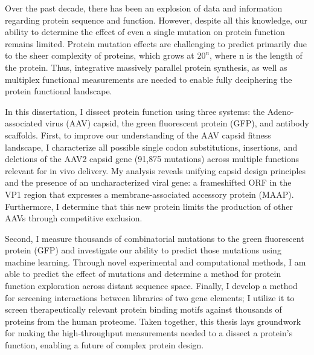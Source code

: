 
Over the past decade, there has been an explosion of data and information regarding protein sequence and function. However, despite all this knowledge, our ability to determine the effect of even a single mutation on protein function remains limited. Protein mutation effects are challenging to predict primarily due to the sheer complexity of proteins, which grows at \(20^n \), where n is the length of the protein. Thus, integrative massively parallel protein synthesis, as well as multiplex functional measurements are needed to enable fully deciphering the protein functional landscape. 

In this dissertation, I dissect protein function using three systems: the Adeno-associated virus (AAV) capsid, the green fluorescent protein (GFP), and antibody scaffolds. First, to improve our understanding of the AAV capsid fitness landscape, I characterize all possible single codon substitutions, insertions, and deletions of the AAV2 capsid gene (91,875 mutations) across multiple functions relevant for in vivo delivery. My analysis reveals unifying capsid design principles and the presence of an uncharacterized viral gene: a frameshifted ORF in the VP1 region that expresses a membrane-associated accessory protein (MAAP). Furthermore, I determine that this new protein limits the production of other AAVs through competitive exclusion.

 Second, I measure thousands of combinatorial mutations to the green fluorescent protein (GFP) and investigate our ability to predict those mutations using machine learning. Through novel experimental and computational methods, I am able to predict the effect of mutations and determine a method for protein function exploration across distant sequence space. Finally, I develop a method for screening interactions between libraries of two gene elements; I utilize it to screen therapeutically relevant protein binding motifs against thousands of proteins from the human proteome. Taken together, this thesis lays groundwork for making the high-throughput measurements needed to a dissect a protein’s function, enabling a future of complex protein design.


